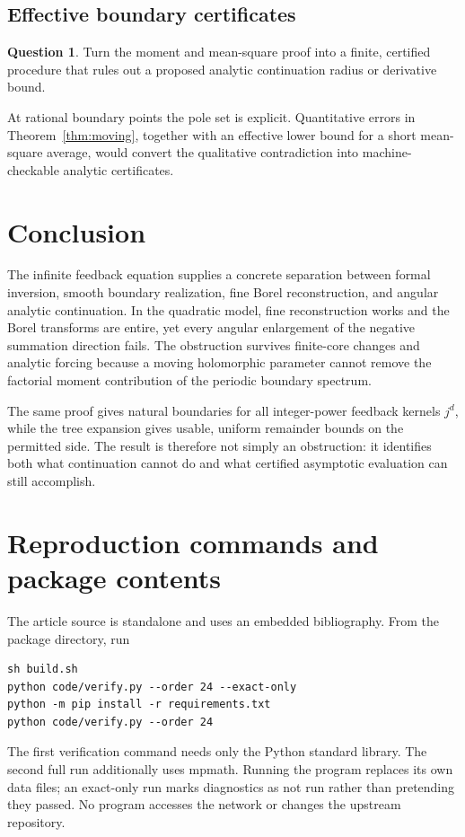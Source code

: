 \documentclass[11pt,a4paper]{article}
\numberwithin{equation}{section}
\theoremstyle{definition}\newtheorem{definition}[theorem]{Definition}
\newtheorem{question}[theorem]{Question}
\theoremstyle{remark}\newtheorem{remark}[theorem]{Remark}
\theoremstyle{definition}
\begin{document}
\subsection{Effective boundary certificates}
\begin{question}
Turn the moment and mean-square proof into a finite, certified procedure
that rules out a proposed analytic continuation radius or derivative bound.
\end{question}
At rational boundary points the pole set is explicit. Quantitative errors
in Theorem~\ref{thm:moving}, together with an effective lower bound for a
short mean-square average, would convert the qualitative contradiction into
machine-checkable analytic certificates.

\section{Conclusion}
The infinite feedback equation supplies a concrete separation between formal
inversion, smooth boundary realization, fine Borel reconstruction, and
angular analytic continuation. In the quadratic model, fine reconstruction
works and the Borel transforms are entire, yet every angular enlargement of
the negative summation direction fails. The obstruction survives finite-core
changes and analytic forcing because a moving holomorphic parameter cannot
remove the factorial moment contribution of the periodic boundary spectrum.

The same proof gives natural boundaries for all integer-power feedback
kernels $j^d$, while the tree expansion gives usable, uniform remainder
bounds on the permitted side. The result is therefore not simply an
obstruction: it identifies both what continuation cannot do and what
certified asymptotic evaluation can still accomplish.

\appendix
\section{Reproduction commands and package contents}
The article source is standalone and uses an embedded bibliography. From the
package directory, run
\begin{verbatim}
sh build.sh
python code/verify.py --order 24 --exact-only
python -m pip install -r requirements.txt
python code/verify.py --order 24
\end{verbatim}
The first verification command needs only the Python standard library. The
second full run additionally uses mpmath. Running the program replaces its
own data files; an exact-only run marks diagnostics as not run rather than
pretending they passed. No program accesses the network or changes the
upstream repository.
\end{document}

